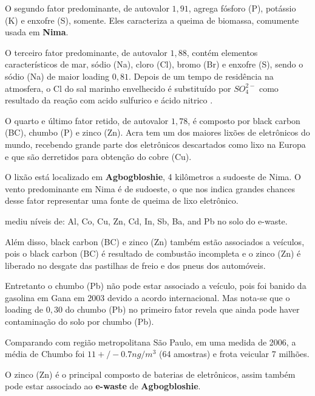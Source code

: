 O segundo fator predominante, de autovalor $1,91$, agrega fósforo (P), 
potássio (K) e enxofre (S), somente. Eles caracteriza a queima de biomassa, 
comumente usada em \textbf{Nima}.

O terceiro fator predominante, de autovalor $1,88$, contém elementos
característicos de mar, sódio (Na), cloro (Cl), bromo (Br) e enxofre (S), 
sendo o sódio (Na) de maior loading $0,81$. 
Depois de um tempo de residência na atmosfera, o Cl do sal marinho envelhecido 
é substituído por $SO_4^{2-}$ como resultado da reação com acido sulfurico e 
ácido nitrico \citep{mcinnes1994}. 


O quarto e último fator retido, de autovalor $1,78$, é composto 
por black carbon (BC), chumbo (P) e zinco (Zn). 
Acra tem um dos maiores lixões de eletrônicos do mundo, recebendo
grande parte dos eletrônicos descartados como lixo na Europa e que são derretidos
para obtenção do cobre (Cu). 

O lixão está localizado em \textbf{Agbogbloshie}, 4 kilômetros a sudoeste de Nima. 
O vento predominante em Nima é de sudoeste, o que nos indica grandes chances 
desse fator representar uma fonte de queima de lixo eletrônico.

\citep{asante2012} mediu níveis de:
Al, Co, Cu, Zn, Cd, In, Sb, Ba, and Pb no solo do e-waste.

Além disso, black carbon (BC) e zinco (Zn) também estão associados a veículos, 
pois o black carbon (BC) é resultado de combustão incompleta e o zinco (Zn) é
liberado no desgate das pastilhas de freio e dos pneus dos automóveis. 

Entretanto o chumbo (Pb) não pode estar associado a veículo, pois 
foi banido da gasolina em Gana em 2003 devido a acordo internacional. 
Mas nota-se que o loading de $0,30$ do chumbo (Pb) no primeiro fator revela 
que ainda pode haver contaminação do solo por chumbo (Pb).

Comparando com região metropolitana São Paulo, em uma medida de 2006, a média de Chumbo foi $11 +/- 0.7 ng/m^3$  
(64 amostras) e frota veicular 7 milhões. 

O zinco (Zn) é o principal composto de baterias de eletrônicos, assim também 
pode estar associado ao \textbf{e-waste} de \textbf{Agbogbloshie}.

